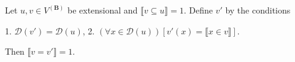 Let $u, v \in V^{(\mathbf{B})}$ be extensional and $\llbracket v \subseteq u \rrbracket = 1$. Define $v'$ by the conditions

1. $\mathcal{D}(v') = \mathcal{D}(u)$,
2. $(\forall x \in \mathcal{D}(u))[v'(x) = \llbracket x \in v \rrbracket]$.

Then $\llbracket v = v' \rrbracket = 1$.
